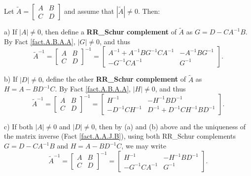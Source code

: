 \begin{fact} \label{fact.A.B.A.B}
Let $\tilde A=\begin{bmatrix} A & B \\ C & D \end{bmatrix}$
and assume that $|\tilde A|\ne 0$.  Then:

\noindent a) If $|A|\ne 0$, then define a {\bf RR_Schur complement} of
$\tilde A$ as $G=D-CA^{-1}B$.  By Fact \ref{fact.A.B.A.A}, $|G|\ne 0$, and thus
\begin{equation*}
    \tilde A^{-1} = \begin{bmatrix} A & B \\ C & D \end{bmatrix}^{-1} =
    \begin{bmatrix} A^{-1}+A^{-1} B G^{-1} C A^{-1} & -A^{-1} B G^{-1} \\ -G^{-1} C A^{-1} & G^{-1} \end{bmatrix}.
\end{equation*}

\noindent b) If $|D|\ne 0$, define the other {\bf RR_Schur
complement} of $\tilde A$ as $H=A-BD^{-1}C$.  By Fact \ref{fact.A.B.A.A}, $|H|\ne 0$, and thus
\begin{equation*}
    \tilde A^{-1} = \begin{bmatrix} A & B \\ C & D \end{bmatrix}^{-1} =
    \begin{bmatrix} H^{-1} & -H^{-1} B D^{-1} \\ - D^{-1} C H^{-1} & D^{-1}+ D^{-1} C H^{-1} B D^{-1}  \end{bmatrix}.
\end{equation*}

\noindent c) If both $|A|\ne 0$ and $|D|\ne 0$, then by (a) and (b) above and the uniqueness of the matrix inverse (Fact \ref{fact.A.A.J.B}),
using both RR_Schur complements $G=D-CA^{-1}B$ and $H=A-BD^{-1}C$, we may write
\begin{equation*}
    \tilde A^{-1} = \begin{bmatrix} A & B \\ C & D \end{bmatrix}^{-1} =
    \begin{bmatrix} H^{-1} & -H^{-1}BD^{-1} \\  -G^{-1}CA^{-1} & G^{-1} \end{bmatrix}.
\end{equation*}
\end{fact}

